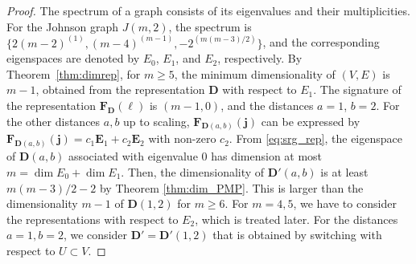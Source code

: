 \documentclass[a4paper, 11pt]{article}
\newcommand{\E}{\boldsymbol{E}}
\newcommand{\J}{\boldsymbol{J}}
\newcommand{\D}{\boldsymbol{D}}
\newcommand{\F}{\boldsymbol{F}}
\newcommand{\jv}{\boldsymbol{j}}
\newcommand{\el}{\boldsymbol{\ell}}
\theoremstyle{definition}
\begin{document}
\begin{proof}
The spectrum of a graph consists of its eigenvalues and their multiplicities. 
For the Johnson graph $J(m,2)$, the spectrum is $\{2(m-2)^{(1)},(m-4)^{(m-1)}, -2^{(m(m-3)/2)}\}$, and the corresponding eigenspaces are denoted by $E_0$, $E_1$, and $E_2$, respectively.  By Theorem~\ref{thm:dimrep}, for $m\geq 5$, the minimum dimensionality of $(V,E)$ is $m-1$, obtained from the representation $\D$ with respect to $E_1$.  
  The signature of the representation $\F_{\D}(\el)$ is $(m-1,0)$, and the distances $a=1$, $b=2$.  
  For the other distances $a,b$ up to scaling, $\F_{\D(a,b)}(\jv)$ can be expressed by $\F_{\D(a,b)}(\jv)=c_1 \E_1+c_2 \E_2$ with non-zero $c_2$.  
  From \eqref{eq:srg_rep}, the eigenspace of $\D(a,b)$ associated with eigenvalue 0 has dimension at most $m= \dim E_0 +\dim E_1$.   
  Then, the dimensionality of $\D'(a,b)$ is at least $m(m-3)/2-2$ by Theorem \ref{thm:dim_PMP}. This is larger than the dimensionality $m-1$ of $\D(1,2)$ for $m\geq 6$. 
For $m=4,5$, we have to consider the representations with respect to $E_2$, which is treated later.  
For the distances $a=1,b=2$, we consider $\D'=\D'(1,2)$ that is obtained by switching with respect to $U\subset V$. 


\end{proof}
\end{document}
